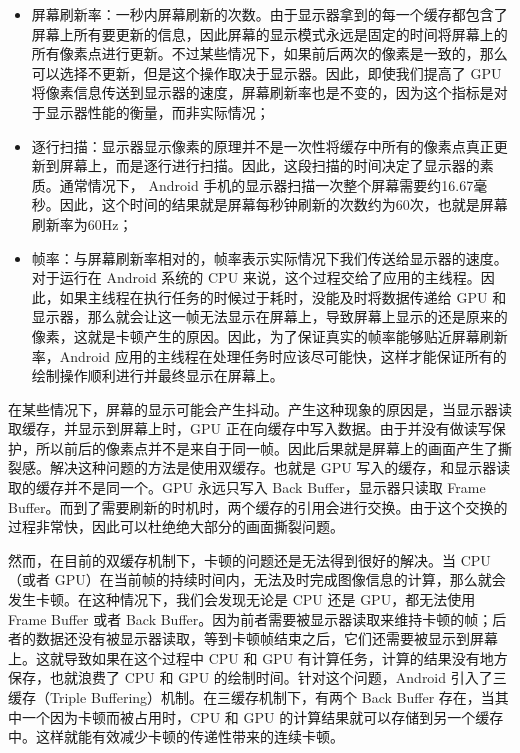 \begin{itemize}
    \item 屏幕刷新率：一秒内屏幕刷新的次数。由于显示器拿到的每一个缓存都包含了屏幕上所有要更新的信息，因此屏幕的显示模式永远是固定的时间将屏幕上的所有像素点进行更新。不过某些情况下，如果前后两次的像素是一致的，那么可以选择不更新，但是这个操作取决于显示器。因此，即使我们提高了 GPU 将像素信息传送到显示器的速度，屏幕刷新率也是不变的，因为这个指标是对于显示器性能的衡量，而非实际情况；
    \item 逐行扫描：显示器显示像素的原理并不是一次性将缓存中所有的像素点真正更新到屏幕上，而是逐行进行扫描。因此，这段扫描的时间决定了显示器的素质。通常情况下， Android 手机的显示器扫描一次整个屏幕需要约16.67毫秒。因此，这个时间的结果就是屏幕每秒钟刷新的次数约为60次，也就是屏幕刷新率为60Hz；
    \item 帧率：与屏幕刷新率相对的，帧率表示实际情况下我们传送给显示器的速度。对于运行在 Android 系统的 CPU 来说，这个过程交给了应用的主线程。因此，如果主线程在执行任务的时候过于耗时，没能及时将数据传递给 GPU 和显示器，那么就会让这一帧无法显示在屏幕上，导致屏幕上显示的还是原来的像素，这就是卡顿产生的原因。因此，为了保证真实的帧率能够贴近屏幕刷新率，Android 应用的主线程在处理任务时应该尽可能快，这样才能保证所有的绘制操作顺利进行并最终显示在屏幕上。
\end{itemize}

在某些情况下，屏幕的显示可能会产生抖动。产生这种现象的原因是，当显示器读取缓存，并显示到屏幕上时，GPU 正在向缓存中写入数据。由于并没有做读写保护，所以前后的像素点并不是来自于同一帧。因此后果就是屏幕上的画面产生了撕裂感。解决这种问题的方法是使用双缓存。也就是 GPU 写入的缓存，和显示器读取的缓存并不是同一个。GPU 永远只写入 Back Buffer，显示器只读取 Frame Buffer。而到了需要刷新的时机时，两个缓存的引用会进行交换。由于这个交换的过程非常快，因此可以杜绝绝大部分的画面撕裂问题。

然而，在目前的双缓存机制下，卡顿的问题还是无法得到很好的解决。当 CPU（或者 GPU）在当前帧的持续时间内，无法及时完成图像信息的计算，那么就会发生卡顿。在这种情况下，我们会发现无论是 CPU 还是 GPU，都无法使用 Frame Buffer 或者 Back Buffer。因为前者需要被显示器读取来维持卡顿的帧；后者的数据还没有被显示器读取，等到卡顿帧结束之后，它们还需要被显示到屏幕上。这就导致如果在这个过程中 CPU 和 GPU 有计算任务，计算的结果没有地方保存，也就浪费了 CPU 和 GPU 的绘制时间。针对这个问题，Android 引入了三缓存（Triple Buffering）机制。\cite{egilmez2017user}在三缓存机制下，有两个 Back Buffer 存在，当其中一个因为卡顿而被占用时，CPU 和 GPU 的计算结果就可以存储到另一个缓存中。这样就能有效减少卡顿的传递性带来的连续卡顿。

